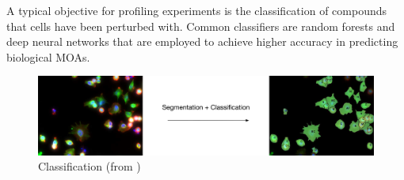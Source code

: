 A typical objective for profiling experiments is the classification of compounds that cells have been perturbed with. 
Common classifiers are random forests and deep neural networks that are employed to achieve higher 
accuracy in predicting biological MOAs.


\begin{figure}[H]
	\centering
	\includegraphics[width=0.8\linewidth]{bilder/cells/classification.png}
	\caption{Classification  (from \cite{Pau})}
	\label{fig:Classification}
\end{figure}





